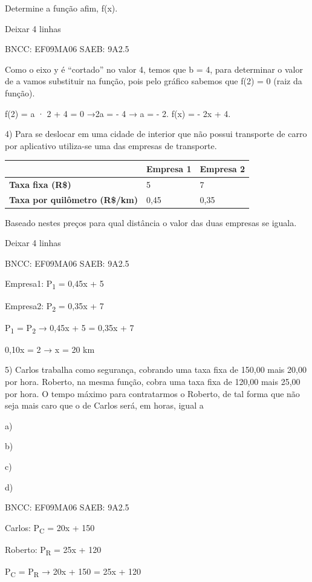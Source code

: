 \begin{escolha}
{{{\begin{escolha}
{Determine a função afim, f(x).

Deixar 4 linhas

BNCC: EF09MA06 SAEB: 9A2.5

Como o eixo y é ``cortado'' no valor 4, temos que b = 4, para determinar
o valor de a vamos substituir na função, pois pelo gráfico sabemos que
f(2) = 0 (raiz da função).

f(2) = a · 2 + 4 = 0 →2a = - 4 → a = - 2. f(x) = - 2x + 4.

4) Para se deslocar em uma cidade de interior que não possui transporte
de carro por aplicativo utiliza-se uma das empresas de transporte.

\begin{longtable}[]{@{}lll@{}}
\toprule\noalign{}
& \textbf{Empresa 1} & \textbf{Empresa 2} \\
\midrule\noalign{}
\endhead
\bottomrule\noalign{}
\endlastfoot
\textbf{Taxa fixa (R\$)} & 5 & 7 \\
\textbf{Taxa por quilômetro (R\$/km)} & 0,45 & 0,35 \\
\end{longtable}

Baseado nestes preços para qual distância o valor das duas empresas se
iguala.

Deixar 4 linhas

BNCC: EF09MA06 SAEB: 9A2.5

Empresa1: P\textsubscript{1} = 0,45x + 5

Empresa2: P\textsubscript{2} = 0,35x + 7

P\textsubscript{1} = P\textsubscript{2} → 0,45x + 5 = 0,35x + 7

0,10x = 2 → x = 20 km

5) Carlos trabalha como segurança, cobrando uma taxa fixa de 150,00 mais
20,00 por hora. Roberto, na mesma função, cobra uma taxa fixa de 120,00
mais 25,00 por hora. O tempo máximo para contratarmos o Roberto, de tal
forma que não seja mais caro que o de Carlos será, em horas, igual a

a)

b)

c)

d)

BNCC: EF09MA06 SAEB: 9A2.5

Carlos: P\textsubscript{C} = 20x + 150

Roberto: P\textsubscript{R} = 25x + 120

P\textsubscript{C} = P\textsubscript{R} → 20x + 150 = 25x + 120

}
\end{escolha}}}}
\end{escolha}
